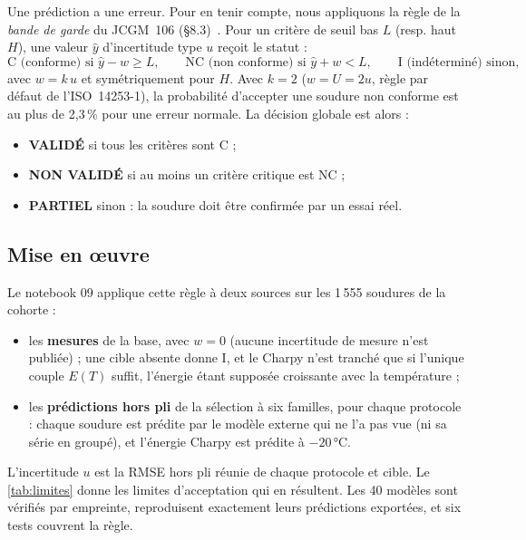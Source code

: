 Une prédiction a une erreur. Pour en tenir compte, nous appliquons la règle de
la \emph{bande de garde} du JCGM~106 (§8.3)~\cite{jcgm_106}. Pour un critère de
seuil bas $L$ (resp. haut $H$), une valeur $\hat{y}$ d'incertitude type $u$
reçoit le statut :
\begin{equation}
  \text{C (conforme) si } \hat{y} - w \geq L, \qquad
  \text{NC (non conforme) si } \hat{y} + w < L, \qquad
  \text{I (indéterminé) sinon},
\end{equation}
avec $w = k\,u$ et symétriquement pour $H$. Avec $k = 2$ ($w = U = 2u$, règle
par défaut de l'ISO~14253-1), la probabilité d'accepter une soudure non conforme
est au plus de 2,3\,\% pour une erreur normale. La décision globale est alors :
\begin{itemize}
  \item \textbf{VALIDÉ} si tous les critères sont C ;
  \item \textbf{NON VALIDÉ} si au moins un critère critique est NC ;
  \item \textbf{PARTIEL} sinon : la soudure doit être confirmée par un essai réel.
\end{itemize}

\subsection{Mise en œuvre}

Le notebook 09 applique cette règle à deux sources sur les 1\,555 soudures de la
cohorte :
\begin{itemize}
  \item les \textbf{mesures} de la base, avec $w = 0$ (aucune incertitude de mesure n'est publiée) ; une cible absente donne I, et le Charpy n'est tranché que si l'unique couple $E(T)$ suffit, l'énergie étant supposée croissante avec la température ;
  \item les \textbf{prédictions hors pli} de la sélection à six familles, pour chaque protocole : chaque soudure est prédite par le modèle externe qui ne l'a pas vue (ni sa série en groupé), et l'énergie Charpy est prédite à $-20$\,°C.
\end{itemize}
L'incertitude $u$ est la RMSE hors pli réunie de chaque protocole et cible. Le
\cref{tab:limites} donne les limites d'acceptation qui en résultent. Les
40 modèles sont vérifiés par empreinte, reproduisent exactement leurs
prédictions exportées, et six tests couvrent la règle.

